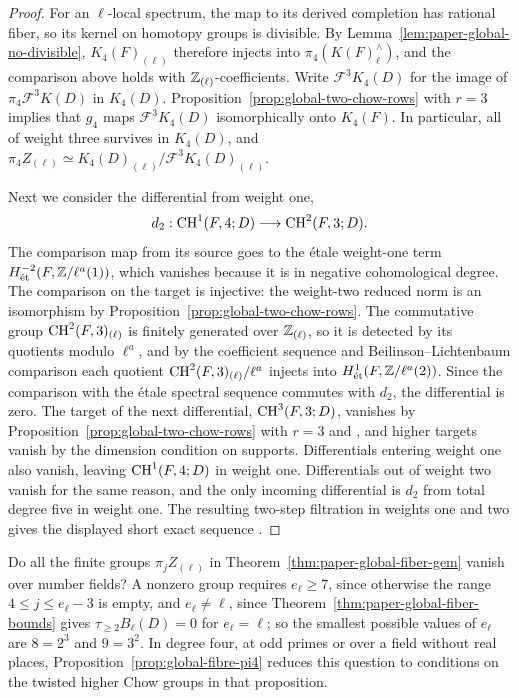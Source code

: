 \begin{proof}
For an $\ell$-local spectrum, the map to its derived completion has rational fiber, so its kernel on homotopy groups is divisible.
By Lemma~\ref{lem:paper-global-no-divisible}, $K_4(F)_{(\ell)}$ therefore injects into $\pi_4(K(F)^\wedge_\ell)$, and the comparison above holds with $\mathbb Z_{(\ell)}$-coefficients.
Write $\mathcal{F}^3K_4(D)$ for the image of $\pi_4\mathcal{F}^3K(D)$ in $K_4(D)$.
Proposition~\ref{prop:global-two-chow-rows} with $r=3$ implies that $g_4$ maps $\mathcal{F}^3K_4(D)$ isomorphically onto $K_4(F)$.
In particular, all of weight three survives in $K_4(D)$, and $\pi_4Z_{(\ell)}\simeq K_4(D)_{(\ell)}/\mathcal{F}^3K_4(D)_{(\ell)}$.

Next we consider the differential from weight one,
\[
 d_2:\operatorname{CH}^1(F,4;D)\longrightarrow\operatorname{CH}^2(F,3;D).
\]
The comparison map from its source goes to the \'etale weight-one term $H^{-2}_{\mathrm{\acute et}}(F,\mathbb Z/\ell^a(1))$, which vanishes because it is in negative cohomological degree.
The comparison on the target is injective: the weight-two reduced norm is an isomorphism by Proposition~\ref{prop:global-two-chow-rows}.
The commutative group $\operatorname{CH}^2(F,3)_{(\ell)}$ is finitely generated over $\mathbb Z_{(\ell)}$, so it is detected by its quotients modulo $\ell^a$, and by the coefficient sequence and Beilinson--Lichtenbaum comparison each quotient $\operatorname{CH}^2(F,3)_{(\ell)}/\ell^a$ injects into $H^1_{\mathrm{\acute et}}(F,\mathbb Z/\ell^a(2))$.
Since the comparison with the \'etale spectral sequence commutes with $d_2$, the differential is zero.
The target of the next differential, $\operatorname{CH}^3(F,3;D)$, vanishes by Proposition~\ref{prop:global-two-chow-rows} with $r=3$ and \cite[Chapter II, Theorem 2.1(3)]{BassTate}, and higher targets vanish by the dimension condition on supports.
Differentials entering weight one also vanish, leaving $\operatorname{CH}^1(F,4;D)$ in weight one.
Differentials out of weight two vanish for the same reason, and the only incoming differential is $d_2$ from total degree five in weight one.
The resulting two-step filtration in weights one and two gives the displayed short exact sequence \cite[Corollary 6.1.4, \S6.9]{KahnLevine2010}.
\end{proof}

\begin{problem}\label{prob:global-fibre-vanishing}
Do all the finite groups $\pi_jZ_{(\ell)}$ in Theorem~\ref{thm:paper-global-fiber-gem} vanish over number fields?
A nonzero group requires $e_\ell\ge7$, since otherwise the range $4\le j\le e_\ell-3$ is empty, and $e_\ell\ne\ell$, since Theorem~\ref{thm:paper-global-fiber-bounds} gives $\tau_{\ge2}B_\ell(D)=0$ for $e_\ell=\ell$; so the smallest possible values of $e_\ell$ are $8=2^3$ and $9=3^2$.
In degree four, at odd primes or over a field without real places, Proposition~\ref{prop:global-fibre-pi4} reduces this question to conditions on the twisted higher Chow groups in that proposition.
\end{problem}
